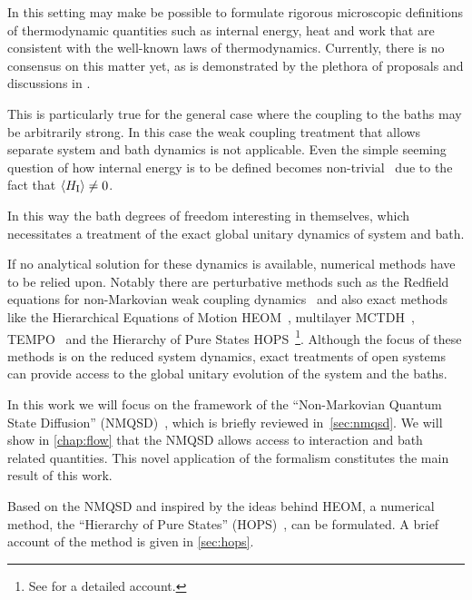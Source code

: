 \documentclass[reprint,aps,superscriptaddress]{revtex4-2}
\def\inter{\ensuremath{\mathrm{I}}}
\begin{document}
In this setting may make be possible to formulate rigorous microscopic
definitions of thermodynamic quantities such as internal energy, heat
and work that are consistent with the well-known laws of
thermodynamics. Currently, there is no consensus on this matter yet,
as is demonstrated by the plethora of proposals and discussions in
\cite{Rivas2019Oct,Talkner2020Oct,Motz2018Nov,Wiedmann2020Mar,Senior2020Feb,Kato2015Aug,Kato2016Dec,Strasberg2021Aug,Talkner2016Aug,Bera2021Feb,Bera2021Jun,Esposito2015Dec,Elouard2022Jul}.

This is particularly true for the general case where the coupling to
the baths may be arbitrarily strong. In this case the weak coupling
treatment that allows separate system and bath dynamics is not
applicable. Even the simple seeming question of how internal energy is
to be defined becomes non-trivial~\cite{Rivas2012,Binder2018} due to
the fact that \(\ev{H_{\inter}}\neq 0\).

In this way the bath degrees of freedom interesting in themselves,
which necessitates a treatment of the exact global unitary dynamics of
system and bath.

If no analytical solution for these dynamics is available, numerical
methods have to be relied upon. Notably there are perturbative methods
such as the Redfield equations for non-Markovian weak coupling
dynamics~\cite{Davidovic2020Sep} and also exact methods like the
Hierarchical Equations of Motion
HEOM~\cite{Tanimura1990Jun,Tang2015Dec}, multilayer
MCTDH~\cite{Wang2010May}, TEMPO~\cite{Strathearn2018Aug} and the
Hierarchy of Pure States HOPS~\cite{Suess2014Oct}\footnote{See
  \cite{RichardDiss} for a detailed account.}. Although the focus of
these methods is on the reduced system dynamics, exact treatments of
open systems can provide access to the global unitary evolution of the
system and the baths.

In this work we will focus on the framework of the ``Non-Markovian
Quantum State Diffusion'' (NMQSD)~\cite{Diosi1998Mar}, which is
briefly reviewed in~\cref{sec:nmqsd}. We will show in \cref{chap:flow}
that the NMQSD allows access to interaction and bath related
quantities. This novel application of the formalism constitutes the
main result of this work.

Based on the NMQSD and inspired by the ideas behind HEOM, a numerical
method, the ``Hierarchy of Pure States''
(HOPS)~\cite{RichardDiss,Hartmann2017Dec}, can be formulated. A brief
account of the method is given in \cref{sec:hops}.
\end{document}
